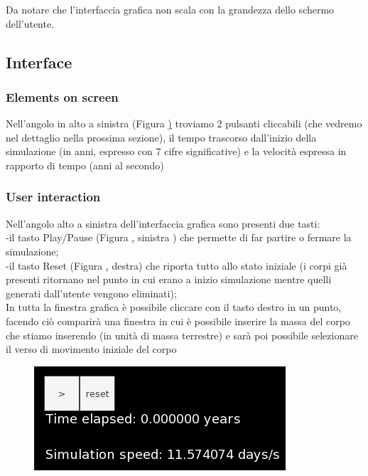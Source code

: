 \documentclass{article}
\begin{document}
Da notare che l'interfaccia grafica non scala con la grandezza dello schermo dell'utente.


\subsection{Interface}
\subsubsection{Elements on screen}
Nell'angolo in alto a sinistra (Figura \href{playpause} ) troviamo 2 pulsanti cliccabili (che vedremo nel dettaglio nella prossima sezione),
il tempo trascorso dall'inizio della simulazione (in anni, espresso con 7 cifre significative) e la velocità espressa in rapporto di tempo (anni al secondo)

\subsubsection{User interaction}
Nell'angolo alto a sinistra dell'interfaccia grafica sono presenti due tasti: \\
-il tasto Play/Pause (Figura \href{playpause}, sinistra ) che permette di far partire o fermare la simulazione;\\
-il tasto Reset (Figura \href{playpause}, destra) che riporta tutto allo stato iniziale (i corpi già presenti ritornano nel punto in cui erano a inizio simulazione mentre quelli generati dall'utente vengono eliminati); \\
In tutta la finestra grafica è possibile cliccare con il tasto destro in un punto, facendo ciò comparirà una finestra in cui è possibile inserire la massa del corpo che stiamo inserendo (in unità di massa terrestre) e sarà poi possibile selezionare il verso di movimento iniziale del corpo

\begin{figure} [H]
    \centering
    \includegraphics[height=.20\linewidth]{Playpause.png}
    \label{playpause}
\end{figure}
\end{document}
